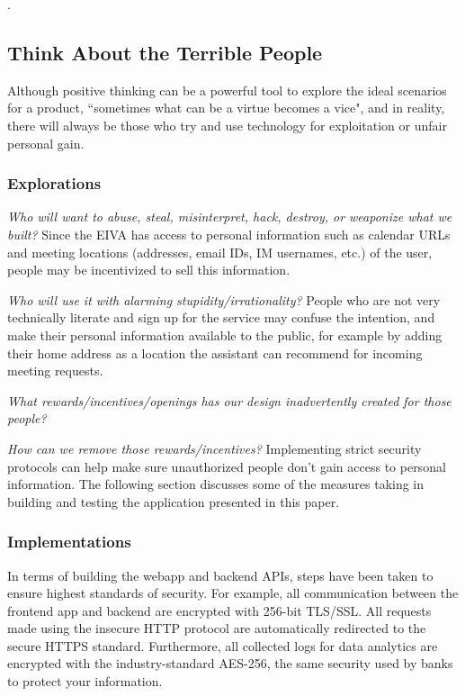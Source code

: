\documentclass{article}
\begin{document}
.

\subsection{Think About the Terrible People}

Although positive thinking can be a powerful tool to explore the ideal scenarios for a product, ``sometimes what can be a virtue becomes a vice", and in reality, there will always be those who try and use technology for exploitation or unfair personal gain.

\subsubsection{Explorations}

\emph{Who will want to abuse, steal, misinterpret, hack, destroy, or weaponize what we built?} Since the EIVA has access to personal information such as calendar URLs and meeting locations (addresses, email IDs, IM usernames, etc.) of the user, people may be incentivized to sell this information.

\emph{Who will use it with alarming stupidity/irrationality?} People who are not very technically literate and sign up for the service may confuse the intention, and make their personal information available to the public, for example by adding their home address as a location the assistant can recommend for incoming meeting requests.

\emph{What rewards/incentives/openings has our design inadvertently created for those people?}

\emph{How can we \emph{remove} those rewards/incentives?} Implementing strict security protocols can help make sure unauthorized people don't gain access to personal information. The following section discusses some of the measures taking in building and testing the application presented in this paper.

\subsubsection{Implementations}

In terms of building the webapp and backend APIs, steps have been taken to ensure  highest standards of security. For example, all communication between the frontend app and backend are encrypted with 256-bit TLS/SSL. All requests made using the insecure HTTP protocol are automatically redirected to the secure HTTPS standard. Furthermore, all collected logs for data analytics are encrypted with the industry-standard AES-256, the same security used by banks to protect your information.
\end{document}
